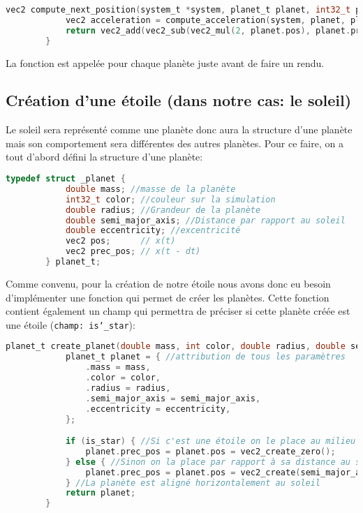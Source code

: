 \documentclass[a4paper,10pt]{article}
\begin{document}
    \begin{lstlisting}[language=c,label={lst:lstlisting6}]
        vec2 compute_next_position(system_t *system, planet_t planet, int32_t planet_index, double delta_t) {
            vec2 acceleration = compute_acceleration(system, planet, planet_index);
            return vec2_add(vec2_sub(vec2_mul(2, planet.pos), planet.prec_pos), vec2_mul(pow(delta_t, 2), acceleration));
        }
    \end{lstlisting}

    La fonction est appelée pour chaque planète juste avant de faire un rendu.

    \subsection{Création d'une étoile (dans notre cas: le soleil)}\label{subsec:création-d'une-étoile(dans-notre-cas:-le-soleil)}

    Le soleil sera représenté comme une planète donc aura la structure d'une planète mais son comportement sera différentes des autres planètes.
    Pour ce faire, on a tout d'abord défini la structure d'une planète:

    \begin{lstlisting}[language=c,label={lst:lstlisting}]
        typedef struct _planet {
            double mass; //masse de la planète
            int32_t color; //couleur sur la simulation
            double radius; //Grandeur de la planète
            double semi_major_axis; //Distance par rapport au soleil
            double eccentricity; //excentricité
            vec2 pos;      // x(t)
            vec2 prec_pos; // x(t - dt)
        } planet_t;
    \end{lstlisting}

    Comme convenu, pour la création de notre étoile nous avons donc eu besoin d'implémenter une fonction qui permet de créer les planètes.
    Cette fonction contient également un champ qui permettra de préciser si cette planète créée est une étoile (\texttt{champ: is\char`_star}):
    
    \begin{lstlisting}[language=c,label={lst:lstlisting2}]
        planet_t create_planet(double mass, int color, double radius, double semi_major_axis, double eccentricity, bool is_star) {
            planet_t planet = { //attribution de tous les paramètres
                .mass = mass,
                .color = color,
                .radius = radius,
                .semi_major_axis = semi_major_axis,
                .eccentricity = eccentricity,
            };

            if (is_star) { //Si c'est une étoile on le place au milieu donc vecteur 0
                planet.prec_pos = planet.pos = vec2_create_zero();
            } else { //Sinon on la place par rapport à sa distance au soleil(étoile) et son excentricité
                planet.prec_pos = planet.pos = vec2_create(semi_major_axis * (1 - eccentricity), 0);
            } //La planète est aligné horizontalement au soleil
            return planet;
        }
    \end{lstlisting}
\end{document}
